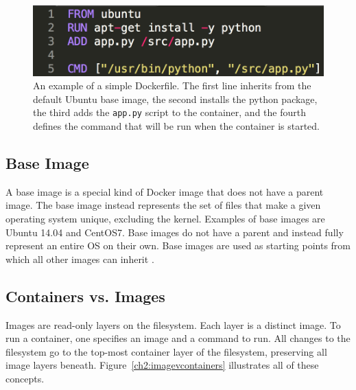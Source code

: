 \begin{figure}[h]
\centering
    \includegraphics[width=.6\textwidth]{dockerfile.png}
    \caption{An example of a simple Dockerfile. The first line inherits from the default Ubuntu base image, the second installs the python package, the third adds the \texttt{app.py} script to the container, and the fourth defines the command that will be run when the container is started.}
\end{figure}

\subsection{Base Image}
A base image is a special kind of Docker image that does not have a parent image. The base image instead represents the set of files that make a given operating system unique, excluding the kernel. Examples of base images are Ubuntu 14.04 and CentOS7. Base images do not have a parent and instead fully represent an entire OS on their own. Base images are used as starting points from which all other images can inherit \cite{baseimage}. 

\subsection{Containers vs. Images}
Images are read-only layers on the filesystem. Each layer is a distinct image. To run a container, one specifies an image and a command to run. All changes to the filesystem go to the top-most container layer of the filesystem, preserving all image layers beneath. Figure~\ref{ch2:imagevcontainers} illustrates all of these concepts.

